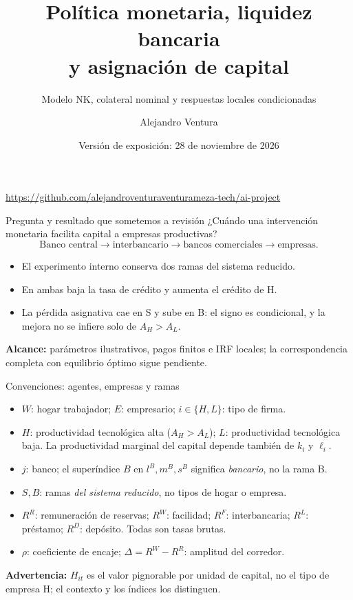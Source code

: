 \documentclass[aspectratio=169,11pt]{beamer}
\title{Política monetaria, liquidez bancaria\\y asignación de capital}
\subtitle{Modelo NK, colateral nominal y respuestas locales condicionadas}
\author{Alejandro Ventura}
\date{Versión de exposición: 28 de noviembre de 2026}
\begin{document}
\begin{frame}[plain]\titlepage
\centering\footnotesize
\url{https://github.com/alejandroventuraventurameza-tech/ai-project}
\end{frame}

\begin{frame}{Pregunta y resultado que sometemos a revisión}
¿Cuándo una intervención monetaria facilita capital a empresas productivas?
\medskip
\[
\text{Banco central}\longrightarrow\text{interbancario}\longrightarrow
\text{bancos comerciales}\longrightarrow\text{empresas}.
\]
\begin{itemize}
\item El experimento interno conserva dos ramas del sistema reducido.
\item En ambas baja la tasa de crédito y aumenta el crédito de H.
\item La pérdida asignativa cae en S y sube en B: el signo es condicional, y la mejora no se infiere solo de $A_H>A_L$.
\end{itemize}
\medskip
\textbf{Alcance:} parámetros ilustrativos, pagos finitos e IRF locales;
la correspondencia completa con equilibrio óptimo sigue pendiente.
\end{frame}

\begin{frame}{Convenciones: agentes, empresas y ramas}
\small
\begin{itemize}
\item $W$: hogar trabajador; $E$: empresario; $i\in\{H,L\}$: tipo de firma.
\item $H$: productividad tecnológica alta ($A_H>A_L$); $L$: productividad tecnológica baja. La productividad marginal del capital depende también de $k_i$ y $\ell_i$.
\item $j$: banco; el superíndice $B$ en $l^B,m^B,s^B$ significa \emph{bancario}, no la rama B.
\item $S,B$: ramas \emph{del sistema reducido}, no tipos de hogar o empresa.
\item $R^R$: remuneración de reservas; $R^W$: facilidad; $R^F$: interbancaria; $R^L$: préstamo; $R^D$: depósito. Todas son tasas brutas.
\item $\rho$: coeficiente de encaje; $\Delta=R^W-R^R$: amplitud del corredor.
\end{itemize}
\medskip
\textbf{Advertencia:} $H_{it}$ es el valor pignorable por unidad de capital, no el tipo de empresa H; el contexto y los índices los distinguen.
\end{frame}
\end{document}
